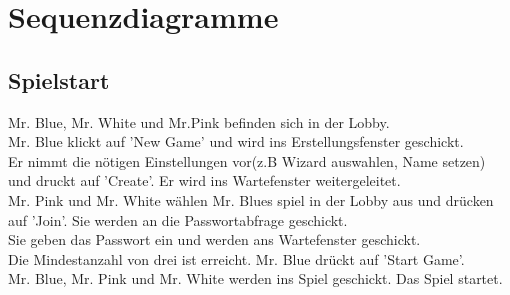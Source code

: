 \documentclass{article}
\begin{document}
\section{Sequenzdiagramme}
	\subsection{Spielstart}
		Mr. Blue, Mr. White und Mr.Pink befinden sich in der Lobby. \\
		Mr. Blue klickt auf 'New Game' und wird ins Erstellungsfenster geschickt. \\
		Er nimmt die nötigen Einstellungen vor(z.B Wizard auswahlen, Name setzen) und druckt auf 'Create'. Er wird ins  Wartefenster weitergeleitet.\\
		Mr. Pink und Mr. White wählen Mr. Blues spiel in der Lobby aus und drücken auf 'Join'. Sie werden an die Passwortabfrage geschickt.\\
		Sie geben das Passwort ein und werden ans Wartefenster geschickt.\\
		Die Mindestanzahl von drei ist erreicht. Mr. Blue drückt auf 'Start Game'.\\
		Mr. Blue, Mr. Pink und Mr. White werden ins Spiel geschickt. Das Spiel startet.\\
\end{document}
